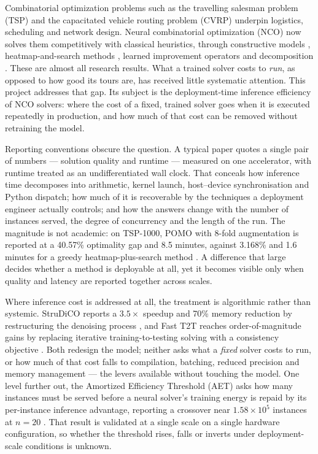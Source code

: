 \documentclass[11pt,a4paper]{article}
\begin{document}
Combinatorial optimization problems such as the travelling salesman problem (TSP)
and the capacitated vehicle routing problem (CVRP) underpin logistics, scheduling
and network design. Neural combinatorial optimization (NCO) now solves them
competitively with classical heuristics, through constructive models
\citep{kool2019attention,kwon2020pomo}, heatmap-and-search methods
\citep{joshi2019gnn,sun2023difusco}, learned improvement operators
\citep{ma2021dact,hottung2022eas} and decomposition \citep{duan2023htsp,ye2024glop}.
These are almost all research results. What a trained solver costs to \emph{run},
as opposed to how good its tours are, has received little systematic attention.
This project addresses that gap. Its subject is the deployment-time inference
efficiency of NCO solvers: where the cost of a fixed, trained solver goes when it
is executed repeatedly in production, and how much of that cost can be removed
without retraining the model.

Reporting conventions obscure the question. A typical paper quotes a single pair
of numbers --- solution quality and runtime --- measured on one accelerator, with
runtime treated as an undifferentiated wall clock. That conceals how inference
time decomposes into arithmetic, kernel launch, host--device synchronisation and
Python dispatch; how much of it is recoverable by the techniques a deployment
engineer actually controls; and how the answers change with the number of
instances served, the degree of concurrency and the length of the run. The
magnitude is not academic: on TSP-1000, POMO with 8-fold augmentation is reported
at a 40.57\% optimality gap and 8.5 minutes, against 3.168\% and 1.6 minutes for
a greedy heatmap-plus-search method \citep{luo2024icam}. A difference that large
decides whether a method is deployable at all, yet it becomes visible only when
quality and latency are reported together across scales.

Where inference cost is addressed at all, the treatment is algorithmic rather
than systemic. StruDiCO reports a $3.5\times$ speedup and 70\% memory reduction by
restructuring the denoising process \citep{wang2025strudico}, and Fast T2T reaches
order-of-magnitude gains by replacing iterative training-to-testing solving with a
consistency objective \citep{li2024fastt2t}. Both redesign the model; neither asks
what a \emph{fixed} solver costs to run, or how much of that cost falls to
compilation, batching, reduced precision and memory management --- the levers
available without touching the model. One level further out, the Amortized
Efficiency Threshold (AET) asks how many instances must be served before a neural
solver's training energy is repaid by its per-instance inference advantage,
reporting a crossover near $1.58\times10^{5}$ instances at $n{=}20$
\citep{aet2026}. That result is validated at a single scale on a single hardware
configuration, so whether the threshold rises, falls or inverts under
deployment-scale conditions is unknown.
\end{document}
